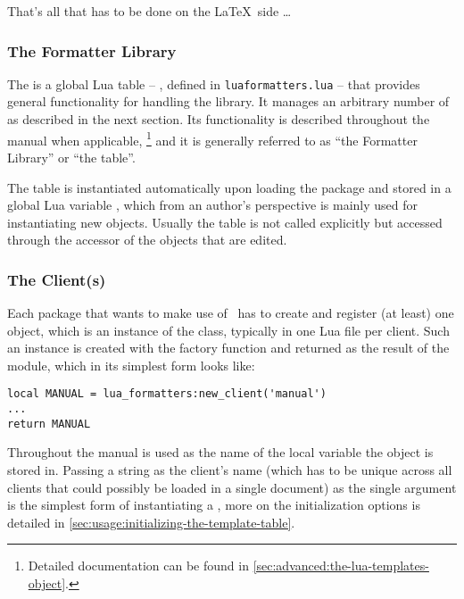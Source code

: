 \documentclass[12pt]{scrartcl}
\begin{document}
\medskip

\noindent That's all that has to be done on the \LaTeX\ side \dots


\subsubsection{The Formatter Library}
\label{sec:intro:walkthrough:formatter-library}

The  is a global Lua table -- ,
defined in \texttt{luaformatters.lua} -- that provides general functionality for
handling the library.  It manages an arbitrary number of 
as described in the next section.  Its functionality is described throughout the
manual when applicable,%
\footnote{Detailed documentation can be found in
\vref{sec:advanced:the-lua-templates-object}.} %
and it is generally referred to as “the Formatter Library” or “the
 table”.

The  table is instantiated automatically upon loading the
package and stored in a global Lua variable , which from
an author's perspective is mainly used for instantiating new 
objects.  Usually the table is not called explicitly but accessed through the
 accessor of the objects that are edited.


\subsubsection{The Client(s)}
\label{sec:intro:walkthrough:the-client}

Each package that wants to make use of \luaformatters\ has to create and
register (at least) one  object, which is an instance of the
 class, typically in one Lua file per client.  Such an
instance is created with the factory function
 and returned as the result of the module,
which in its simplest form looks like:

\begin{verbatim}
local MANUAL = lua_formatters:new_client('manual')
...
return MANUAL
\end{verbatim}

\noindent Throughout the manual  is used as the name of the local
variable the  object is stored in.  Passing a string as
the client's name (which has to be unique across all clients that could possibly
be loaded in a single document) as the single argument is the simplest form of
instantiating a , more on the initialization options is detailed in
\vref{sec:usage:initializing-the-template-table}.
\end{document}

